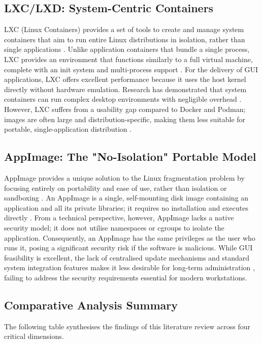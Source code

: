 \documentclass[journal,onecolumn]{IEEEtran}
\begin{document}
\subsection{LXC/LXD: System-Centric Containers}
LXC (Linux Containers) provides a set of tools to create and manage system containers that aim to run entire Linux distributions in isolation, rather than single applications \cite{Sangam2017, Dua2014}. Unlike application containers that bundle a single process, LXC provides an environment that functions similarly to a full virtual machine, complete with an init system and multi-process support \cite{Wang2023resource}. For the delivery of GUI applications, LXC offers excellent performance because it uses the host kernel directly without hardware emulation. Research has demonstrated that system containers can run complex desktop environments with negligible overhead \cite{Soltesz2007}. However, LXC suffers from a usability gap compared to Docker and Podman; images are often large and distribution-specific, making them less suitable for portable, single-application distribution \cite{Falesnik2024}.

\subsection{AppImage: The "No-Isolation" Portable Model}
AppImage provides a unique solution to the Linux fragmentation problem by focusing entirely on portability and ease of use, rather than isolation or sandboxing \cite{Alser2022}. An AppImage is a single, self-mounting disk image containing an application and all its private libraries; it requires no installation and executes directly \cite{Singh2025, Dunlap2022}. From a technical perspective, however, AppImage lacks a native security model; it does not utilise namespaces or cgroups to isolate the application. Consequently, an AppImage has the same privileges as the user who runs it, posing a significant security risk if the software is malicious. While GUI feasibility is excellent, the lack of centralised update mechanisms and standard system integration features makes it less desirable for long-term administration \cite{Singh2025, Dunlap2022}, failing to address the security requirements essential for modern workstations.

\newpage

\subsection{Comparative Analysis Summary}
The following table synthesises the findings of this literature review across four critical dimensions.
\end{document}
